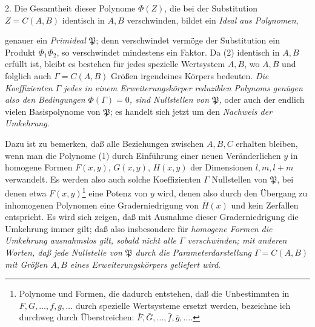 2. Die Gesamtheit dieser Polynome $\Phi(Z)$, die bei der Substitution $Z=C(A,B)$ identisch in $A,B$ verschwinden, bildet ein \emph{Ideal aus Polynomen},\addtocounter{footnote}{1} genauer ein \emph{Primideal $\mathfrak P$}; denn verschwindet vermöge der Substitution ein Produkt $\Phi_1\Phi_2$, so verschwindet mindestens ein Faktor. Da (2) identisch in $A,B$ erfüllt ist, bleibt es bestehen für jedes spezielle Wertsystem $A,B$, wo $A,B$ und folglich auch $\Gamma=C(A,B)$ Größen irgendeines Körpers bedeuten. \emph{Die Koeffizienten $\Gamma$ jedes in einem Erweiterungskörper reduziblen Polynoms genügen also den Bedingungen $\Phi(\Gamma)=0$, sind Nullstellen von $\mathfrak P$,} oder auch der endlich vielen Basispolynome von $\mathfrak P$; es handelt sich jetzt um den \emph{Nachweis der Umkehrung}.

Dazu ist zu bemerken, daß alle Beziehungen zwischen $A,B,C$ erhalten bleiben, wenn man die Polynome (1) durch Einführung einer neuen Veränderlichen $y$ in homogene Formen $F(x,y)$, $G(x,y)$, $H(x,y)$ der Dimensionen $l,m,l+m$ verwandelt. Es werden also auch solche Koeffizienten $\Gamma$ Nullstellen von $\mathfrak P$, bei denen etwa $F(x,y)$\footnote{Polynome und Formen, die dadurch entstehen, daß die Unbestimmten in $F,G,\ldots,f,g,\ldots$ durch spezielle Wertsysteme ersetzt werden, bezeichne ich durchweg durch Überstreichen: $\bar F,\bar G,\ldots,\bar f,\bar g,\ldots$.} eine Potenz von $y$ wird, denen also durch den Übergang zu inhomogenen Polynomen eine Graderniedrigung von $\bar H(x)$ und kein Zerfallen entspricht. Es wird sich zeigen, daß mit Ausnahme dieser Graderniedrigung die Umkehrung immer gilt; daß also insbesondere für \emph{homogene Formen die Umkehrung ausnahmslos gilt, sobald nicht alle $\Gamma$ verschwinden; mit anderen Worten, daß jede Nullstelle von $\mathfrak P$ durch die Parameterdarstellung $\Gamma=C(A,B)$ mit Größen $A,B$ eines Erweiterungskörpers geliefert wird}.\addtocounter{footnote}{1}

